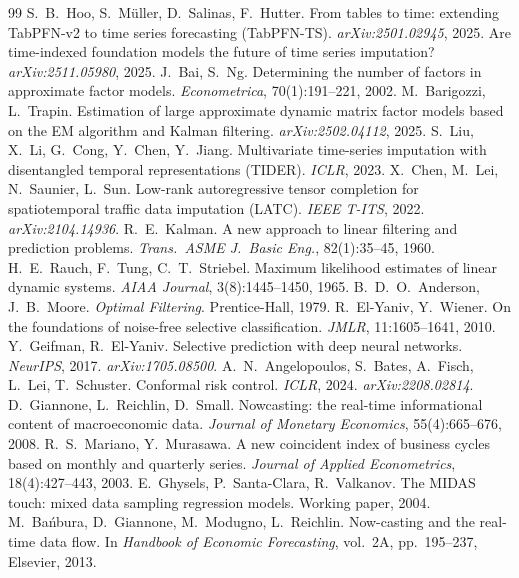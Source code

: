 \documentclass[10pt,twocolumn]{article}
\begin{document}
\begin{thebibliography}{99}
 S.~B.~Hoo, S.~M\"uller, D.~Salinas, F.~Hutter.
From tables to time: extending TabPFN-v2 to time series forecasting (TabPFN-TS).
\emph{arXiv:2501.02945}, 2025.
 Are time-indexed foundation models the future of
time series imputation? \emph{arXiv:2511.05980}, 2025.
 J.~Bai, S.~Ng. Determining the number of factors in
approximate factor models. \emph{Econometrica}, 70(1):191--221, 2002.
 M.~Barigozzi, L.~Trapin. Estimation of large
approximate dynamic matrix factor models based on the EM algorithm and Kalman
filtering. \emph{arXiv:2502.04112}, 2025.
 S.~Liu, X.~Li, G.~Cong, Y.~Chen, Y.~Jiang. Multivariate
time-series imputation with disentangled temporal representations (TIDER).
\emph{ICLR}, 2023.
 X.~Chen, M.~Lei, N.~Saunier, L.~Sun. Low-rank
autoregressive tensor completion for spatiotemporal traffic data imputation
(LATC). \emph{IEEE T-ITS}, 2022. \emph{arXiv:2104.14936}.
 R.~E.~Kalman. A new approach to linear filtering and
prediction problems. \emph{Trans.\ ASME J.\ Basic Eng.}, 82(1):35--45, 1960.
 H.~E.~Rauch, F.~Tung, C.~T.~Striebel. Maximum likelihood
estimates of linear dynamic systems. \emph{AIAA Journal}, 3(8):1445--1450, 1965.
 B.~D.~O.~Anderson, J.~B.~Moore. \emph{Optimal
Filtering}. Prentice-Hall, 1979.
 R.~El-Yaniv, Y.~Wiener. On the foundations of
noise-free selective classification. \emph{JMLR}, 11:1605--1641, 2010.
 Y.~Geifman, R.~El-Yaniv. Selective prediction
with deep neural networks. \emph{NeurIPS}, 2017. \emph{arXiv:1705.08500}.
 A.~N.~Angelopoulos, S.~Bates, A.~Fisch,
L.~Lei, T.~Schuster. Conformal risk control. \emph{ICLR}, 2024. \emph{arXiv:2208.02814}.
 D.~Giannone, L.~Reichlin, D.~Small. Nowcasting:
the real-time informational content of macroeconomic data. \emph{Journal of
Monetary Economics}, 55(4):665--676, 2008.
 R.~S.~Mariano, Y.~Murasawa. A new coincident index
of business cycles based on monthly and quarterly series. \emph{Journal of
Applied Econometrics}, 18(4):427--443, 2003.
 E.~Ghysels, P.~Santa-Clara, R.~Valkanov. The MIDAS
touch: mixed data sampling regression models. Working paper, 2004.
 M.~Ba\'nbura, D.~Giannone, M.~Modugno,
L.~Reichlin. Now-casting and the real-time data flow. In \emph{Handbook of
Economic Forecasting}, vol.\ 2A, pp.\ 195--237, Elsevier, 2013.
\end{thebibliography}
\end{document}
